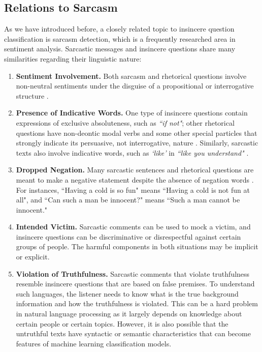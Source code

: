 \documentclass[12pt]{diazessay} %
\begin{document}
\subsection{Relations to Sarcasm} \label{relations-to-sarcasm}

As we have introduced before, a closely related topic to insincere question classification is sarcasm detection, which is a frequently researched area in sentiment analysis\citep{joshi2017}. Sarcastic messages and insincere questions share many similarities regarding their linguistic nature:

\begin{enumerate}
	\item \textbf{Sentiment Involvement.} Both sarcasm and rhetorical questions involve non-neutral sentiments under the disguise of a propositional or interrogative structure \citep{joshi2017, schmidt1977}. 
	\item \textbf{Presence of Indicative Words.} One type of insincere questions contain expressions of exclusive absoluteness, such as \textit{``if not"}; other rhetorical questions have non-deontic modal verbs and some other special particles that strongly indicate its persuasive, not interrogative, nature \citep{schmidt1977}. Similarly, sarcastic texts also involve indicative words, such as \textit{`like'} in \textit{``like you understand"} \citep{joshi2017}. 
	\item \textbf{Dropped Negation.} Many sarcastic sentences and rhetorical questions are meant to make a negative statement despite the absence of negation words  \citep{joshi2017, schmidt1977}. For instances, ``Having a cold is so fun" means ``Having a cold is not fun at all", and ``Can such a man be innocent?" means ``Such a man cannot be innocent."
	\item \textbf{Intended Victim.} Sarcastic comments can be used to mock a victim, and insincere questions can be discriminative or disrespectful against certain groups of people. The harmful components in both situations may be implicit or explicit. 
	\item \textbf{Violation of Truthfulness.} Sarcastic comments that violate truthfulness resemble insincere questions that are based on false premises. To understand such languages, the listener needs to know what is the true background information and how the truthfulness is violated\citep{joshi2017}. This can be a hard problem in natural language processing as it largely depends on knowledge about certain people or certain topics. However, it is also possible that the untruthful texts have syntactic or semantic characteristics that can become features of machine learning classification models.  
\end{enumerate}
\end{document}
